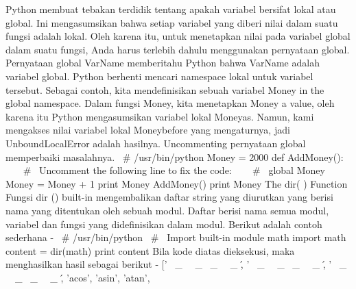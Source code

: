 Python membuat tebakan terdidik tentang apakah variabel bersifat lokal atau global. Ini mengasumsikan bahwa setiap variabel yang diberi nilai dalam suatu fungsi adalah lokal.  
Oleh karena itu, untuk menetapkan nilai pada variabel global dalam suatu fungsi, Anda harus terlebih dahulu menggunakan pernyataan global.  
Pernyataan global VarName memberitahu Python bahwa VarName adalah variabel global. Python berhenti mencari namespace lokal untuk variabel tersebut. 
Sebagai contoh, kita mendefinisikan sebuah variabel Money in the global namespace. Dalam fungsi Money, kita menetapkan Money a value, oleh karena itu Python mengasumsikan variabel lokal Moneyas. Namun, kami mengakses nilai variabel lokal Moneybefore yang mengaturnya, jadi UnboundLocalError adalah hasilnya. Uncommenting pernyataan global memperbaiki masalahnya. 
 \hspace*{0.5in}  \  \#  \!/usr/bin/python  
 \hspace*{0.5in} Money = 2000  
 \hspace*{0.5in} def AddMoney():  
 \hspace*{0.5in} ~~  \  \#  \ Uncomment the following line to fix the code:  
 \hspace*{0.5in} ~~  \  \#  \ global Money  
 \hspace*{0.5in} ~~ Money = Money + 1  
 \hspace*{0.5in} print Money  
 \hspace*{0.5in} AddMoney() 
 \hspace*{0.5in} print Money  
The dir( ) Function  
Fungsi dir () built-in mengembalikan daftar string yang diurutkan yang berisi nama yang ditentukan oleh sebuah modul. 
Daftar berisi nama semua modul, variabel dan fungsi yang didefinisikan dalam modul. Berikut adalah contoh sederhana - 
 \hspace*{0.5in}  \  \#  \!/usr/bin/python 
 \hspace*{0.5in}  \  \#  \ Import built-in module math  
 \hspace*{0.5in} import math  
 \hspace*{0.5in} content = dir(math) 
 \hspace*{0.5in} print content 
Bila kode diatas dieksekusi, maka menghasilkan hasil sebagai berikut - 
 \hspace*{0.5in} [' \  \_  \ \  \_  \doc \  \_  \ \  \_  \', ' \  \_  \ \  \_  \file \  \_  \ \  \_  \', ' \  \_  \ \  \_  \name \  \_  \ \  \_  \', 'acos', 'asin', 'atan',
 
